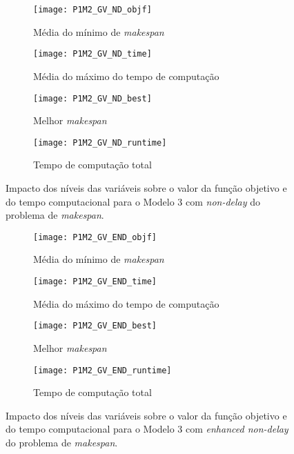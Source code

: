 \begin{figure}[H]
	\centering
	\begin{subfigure}{0.49\textwidth}
	\centering
		\texttt{[image: P1M2\_GV\_ND\_objf]}
		\caption{Média do mínimo de \textit{makespan}}
		\label{fig:P1M2_GV_ND_objf}
	\end{subfigure}
	\begin{subfigure}{0.49\textwidth}
	\centering
		\texttt{[image: P1M2\_GV\_ND\_time]}
		\caption{Média do máximo do tempo de computação}
		\label{fig:P1M2_GV_ND_time}
	\end{subfigure}
	\label{fig:P1M2_GV_ND_alt}
	\centering
	\begin{subfigure}{0.49\textwidth}
	\centering
		\texttt{[image: P1M2\_GV\_ND\_best]}
		\caption{Melhor \textit{makespan}}
		\label{fig:P1M2_GV_ND_best}
	\end{subfigure}
	\begin{subfigure}{0.49\textwidth}
	\centering
		\texttt{[image: P1M2\_GV\_ND\_runtime]}
		\caption{Tempo de computação total}
		\label{fig:P1M2_GV_ND_runtime}
	\end{subfigure}
	\caption{Impacto dos níveis das variáveis sobre o valor da função objetivo e do tempo computacional para o Modelo 3 com \textit{non-delay} do problema de \textit{makespan}.}
	\label{fig:P1M2_GV_ND_alt}
\end{figure}

\begin{figure}[H]
	\centering
	\begin{subfigure}{0.49\textwidth}
	\centering
		\texttt{[image: P1M2\_GV\_END\_objf]}
		\caption{Média do mínimo de \textit{makespan}}
		\label{fig:P1M2_GV_END_objf}
	\end{subfigure}
	\begin{subfigure}{0.49\textwidth}
	\centering
		\texttt{[image: P1M2\_GV\_END\_time]}
		\caption{Média do máximo do tempo de computação}
		\label{fig:P1M2_GV_END_time}
	\end{subfigure}
	\label{fig:P1M2_GV_ND_alt}
	\centering
	\begin{subfigure}{0.49\textwidth}
	\centering
		\texttt{[image: P1M2\_GV\_END\_best]}
		\caption{Melhor \textit{makespan}}
		\label{fig:P1M2_GV_END_best}
	\end{subfigure}
	\begin{subfigure}{0.49\textwidth}
	\centering
		\texttt{[image: P1M2\_GV\_END\_runtime]}
		\caption{Tempo de computação total}
		\label{fig:P1M2_GV_END_runtime}
	\end{subfigure}
	\caption{Impacto dos níveis das variáveis sobre o valor da função objetivo e do tempo computacional para o Modelo 3 com \textit{enhanced non-delay} do problema de \textit{makespan}.}
	\label{fig:P1M2_GV_END_alt}
\end{figure}






